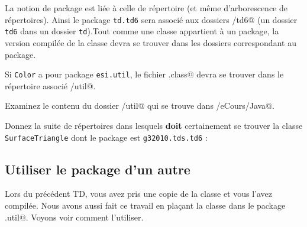 \documentclass[a4paper,11pt]{article}
\begin{document}
				La notion de package est li\'ee \`a celle de r\'epertoire (et m\^eme d'arborescence de r\'epertoires).
				Ainsi le package \verb|td.td6| sera associ\'e aux dossiers \verb@td/td6@
				(un dossier \verb|td6| dans un dossier \verb|td|).Tout comme une classe appartient \`a un package,
				la version compil\'ee de la classe devra se trouver dans les dossiers correspondant au package.
			
            \par
        
			
		\begin{Exemple}{}
			Si \verb|Color| a pour package \verb|esi.util|, le fichier \verb@Color.class@
				devra se trouver dans le r\'epertoire associ\'e \verb@esi/util@.
		\end{Exemple}
			
            \par
        
			
		\begin{Exercice}{}
       				Examinez le contenu du dossier \verb@esi/util@
				qui se trouve dans \verb@/eCours/Java@.
		\end{Exercice}
			
            \par
        
			
		\begin{Exercice}{} 
       			Donnez la suite de r\'epertoires dans lesquels \textbf{doit} certainement se trouver la classe \verb|SurfaceTriangle|
			dont le package est  \verb|g32010.tds.td6| :
			\par
			\fcolorbox{gray}{verylightgray}{
					\begin{minipage}[c][1cm][c]{\textwidth}\textcolor{verylightgray}{X}\end{minipage}
				}
		\end{Exercice}	
			
			
	\subsection{Utiliser le package d'un autre}
		Lors du pr\'ec\'edent TD, vous avez pris une copie de la classe \verb@Color@
		et vous l'avez compil\'ee. Nous avons aussi fait ce travail en pla\c cant la classe dans le package
		\verb@esi.util@. Voyons voir comment l'utiliser.			
		
            \par
        
\end{document}
